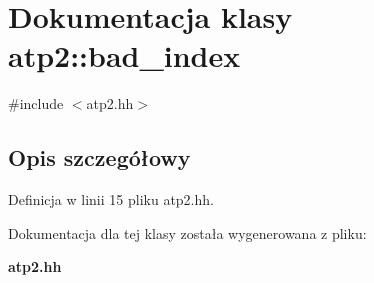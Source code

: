 \section{Dokumentacja klasy atp2\+:\+:bad\+\_\+index}
\label{classatp2_1_1bad__index}


{\ttfamily \#include $<$atp2.\+hh$>$}



\subsection{Opis szczegółowy}


Definicja w linii 15 pliku atp2.\+hh.



Dokumentacja dla tej klasy została wygenerowana z pliku\+:\begin{DoxyCompactItemize}
\item 
{\bf atp2.\+hh}\end{DoxyCompactItemize}

